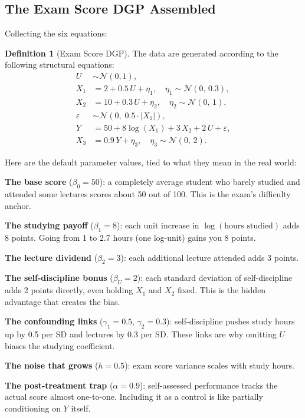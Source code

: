 \documentclass[11pt,a4paper]{article}
\theoremstyle{definition}
\newtheorem{definition}{Definition}[section]
\theoremstyle{plain}
\theoremstyle{remark}
\begin{document}
\subsection{The Exam Score DGP Assembled}\label{subsec:exam-dgp}

Collecting the six equations:

\begin{definition}[Exam Score DGP]\label{def:dgp}
The data are generated according to the following structural equations:
\begin{align}
  U &\sim \mathcal{N}(0,1), \\
  X_1 &= 2 + 0.5\,U + \eta_1, \quad \eta_1 \sim \mathcal{N}(0,\,0.3), \\
  X_2 &= 10 + 0.3\,U + \eta_2, \quad \eta_2 \sim \mathcal{N}(0,\,1), \\
  \varepsilon &\sim \mathcal{N}\!\left(0,\; 0.5 \cdot |X_1|\right), \\
  Y &= 50 + 8\log(X_1) + 3\,X_2 + 2\,U + \varepsilon, \\
  X_3 &= 0.9\,Y + \eta_3, \quad \eta_3 \sim \mathcal{N}(0,\,2).
\end{align}
\end{definition}

\begin{keyinsight}[title={The Numbers Behind the Story}]
Here are the default parameter values, tied to what they mean in the real world:

\textbf{The base score} ($\beta_0 = 50$): a completely average student who barely studied and attended some lectures scores about 50 out of 100. This is the exam's difficulty anchor.

\textbf{The studying payoff} ($\beta_1 = 8$): each unit increase in $\log(\text{hours studied})$ adds 8 points. Going from 1 to 2.7 hours (one log-unit) gains you 8 points.

\textbf{The lecture dividend} ($\beta_2 = 3$): each additional lecture attended adds 3 points.

\textbf{The self-discipline bonus} ($\beta_U = 2$): each standard deviation of self-discipline adds 2 points directly, even holding $X_1$ and $X_2$ fixed. This is the hidden advantage that creates the bias.

\textbf{The confounding links} ($\gamma_1 = 0.5$, $\gamma_2 = 0.3$): self-discipline pushes study hours up by 0.5 per SD and lectures by 0.3 per SD. These links are why omitting $U$ biases the studying coefficient.

\textbf{The noise that grows} ($h = 0.5$): exam score variance scales with study hours.

\textbf{The post-treatment trap} ($\alpha = 0.9$): self-assessed performance tracks the actual score almost one-to-one. Including it as a control is like partially conditioning on $Y$ itself.
\end{keyinsight}
\end{document}
